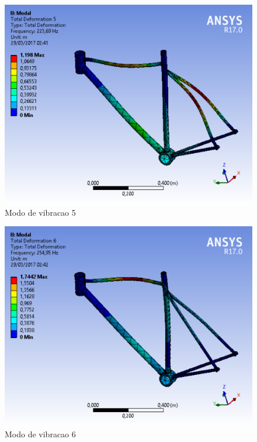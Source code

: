 \graphicspath{{figuras/}}
	\begin{figure}[h!]
	\centering
	\includegraphics[scale=0.80]{modo_de_vibracao_5.png}
	\caption{Modo de vibracao 5}
	\label{img:modo_de_vibracao5}
	\end{figure}	

\graphicspath{{figuras/}}
	\begin{figure}[h!]
	\centering
	\includegraphics[scale=0.80]{modo_de_vibracao_6.png}
	\caption{Modo de vibracao 6}
	\label{img:modo_de_vibracao 6}
	\end{figure}	



